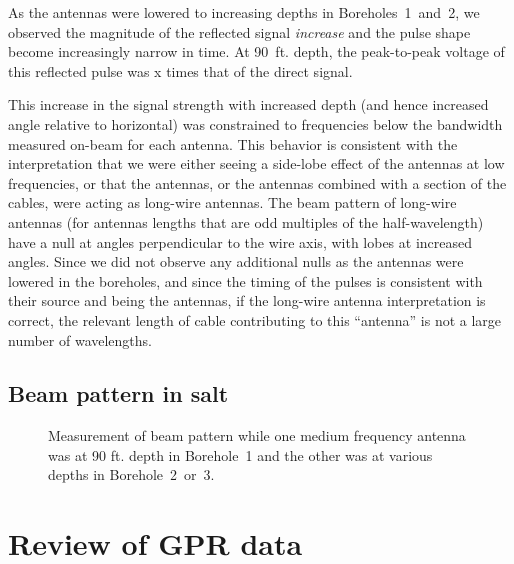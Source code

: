 \documentclass{elsart}
\begin{document}
  As the antennas were lowered to increasing depths in Boreholes~1~and~2, 
  we observed the 
  magnitude of the reflected signal {\em increase} and the pulse shape 
  become increasingly narrow in time.  
  At 90~ft. depth, the peak-to-peak voltage of this reflected pulse was
  x times that of the direct signal.

  This increase in the signal strength with increased depth (and hence
  increased angle relative to horizontal) was
  constrained to frequencies below the bandwidth measured on-beam  
  for each antenna.  This behavior is consistent with the interpretation that
  we were either seeing a side-lobe effect of the antennas at low frequencies,
  or that the antennas, or the antennas combined with a section of the
  cables, were acting as long-wire antennas.  The beam pattern of long-wire antennas 
  (for antennas lengths that are odd multiples of the half-wavelength) have a null
  at angles perpendicular to the wire axis, with lobes at increased angles.
  Since we did not observe any additional nulls as the antennas were lowered
  in the boreholes, and since the timing of the pulses is consistent with
  their source and being the antennas, if the long-wire antenna interpretation 
  is correct, the relevant length of cable contributing to this ``antenna'' is not a 
  large number of wavelengths. 
  
 
  
\subsection{Beam pattern in salt}

\begin{figure}
  \caption{Measurement of beam pattern while one medium frequency antenna was at 90 ft. depth in Borehole~1 and the other was at various depths in Borehole~2~or~3.}
  \label{fig:beampattern}
\end{figure}

\section{Review of GPR data}
\end{document}
